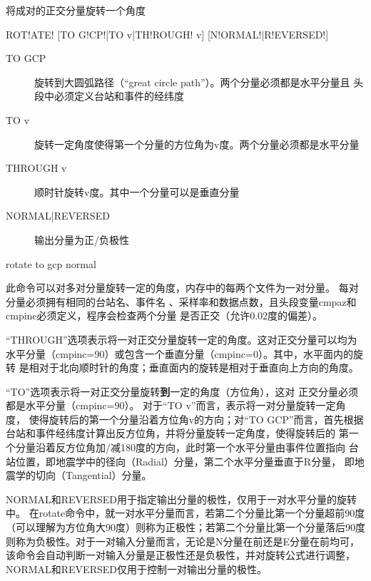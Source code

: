 \label{cmd:rotate}

将成对的正交分量旋转一个角度

\begin{SACSTX}
ROT!ATE! [TO G!CP!|TO v|TH!ROUGH! v] [N!ORMAL!|R!EVERSED!]
\end{SACSTX}

\begin{description}
\item [TO GCP] 旋转到大圆弧路径（``great circle path''）。两个分量必须都是水平分量且
    头段中必须定义台站和事件的经纬度
\item [TO v] 旋转一定角度使得第一个分量的方位角为v度。两个分量必须都是水平分量
\item [THROUGH v] 顺时针旋转v度。其中一个分量可以是垂直分量
\item [NORMAL|REVERSED] 输出分量为正/负极性
\end{description}

\begin{SACDFT}
rotate to gcp normal
\end{SACDFT}

此命令可以对多对分量旋转一定的角度，内存中的每两个文件为一对分量。
每对分量必须拥有相同的台站名、事件名
、采样率和数据点数，且头段变量cmpaz和cmpinc必须定义，程序会检查两个分量
是否正交（允许0.02度的偏差）。

``THROUGH''选项表示将一对正交分量旋转一定的角度。这对正交分量可以均为
水平分量（cmpinc=90）或包含一个垂直分量（cmpinc=0）。其中，水平面内的旋转
是相对于北向顺时针的角度；垂直面内的旋转是相对于垂直向上方向的角度。

``TO''选项表示将一对正交分量旋转\textbf{到}一定的角度（方位角），这对
正交分量必须都是水平分量（cmpinc=90）。
对于``TO v''而言，表示将一对分量旋转一定角度，
使得旋转后的第一个分量沿着方位角v的方向；对``TO GCP''而言，首先根据
台站和事件经纬度计算出反方位角，并将分量旋转一定角度，使得旋转后的
第一个分量沿着反方位角加/减180度的方向，此时第一个水平分量由事件位置指向
台站位置，即地震学中的径向（Radial）分量，第二个水平分量垂直于R分量，
即地震学的切向（Tangential）分量。

NORMAL和REVERSED用于指定输出分量的极性，仅用于一对水平分量的旋转中。
在rotate命令中，就一对水平分量而言，若第二个分量比第一个分量超前90度
（可以理解为方位角大90度）则称为正极性；若第二个分量比第一个分量落后90度
则称为负极性。对于一对输入分量而言，无论是N分量在前还是E分量在前均可，
该命令会自动判断一对输入分量是正极性还是负极性，并对旋转公式进行调整，
NORMAL和REVERSED仅用于控制一对输出分量的极性。

